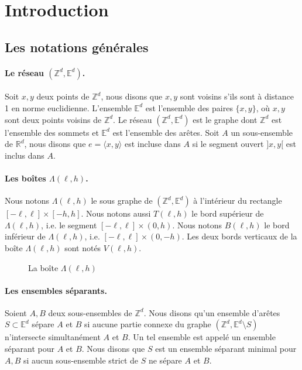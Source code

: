 \documentclass[titlepage,a4paper,12pt]{article}
\newcounter{th}
\begin{document}
\section{Introduction}
\subsection{Les notations générales}
\paragraph{Le réseau $(\mathbb{Z}^d,\mathbb{E}^d)$.} Soit $x,y$ deux points de $\mathbb{Z}^d$, nous disons que $x,y$ sont voisins s'ils sont à distance 1 en norme euclidienne. L'ensemble $\mathbb{E}^d$ est l'ensemble des paires $\{x,y\}$, où $x,y$ sont deux points voisins de $\mathbb{Z}^d$. Le réseau $(\mathbb{Z}^d, \mathbb{E}^d)$ est le graphe dont $\mathbb{Z}^d$ est l'ensemble des sommets et $\mathbb{E}^d$ est l'ensemble des arêtes. Soit $A$ un sous-ensemble de $\mathbb{R}^d$, nous disons que $e = \langle x,y\rangle$ est incluse dans $A$ si le segment ouvert $]x,y[$ est inclus dans $A$.

\paragraph{Les boîtes $\Lambda(\ell,h)$.} Nous notons $\Lambda(\ell,h)$ le sous graphe de $(\mathbb{Z}^d,\mathbb{E}^d)$ à l'inté\-rieur du rectangle $[-\ell,\ell]\times[-h,h]$. Nous notons aussi $T(\ell,h)$ le bord supérieur de $\Lambda(\ell,h)$, i.e. le segment $[-\ell,\ell]\times(0,h)$. Nous notons $B(\ell,h)$ le bord inférieur de $\Lambda(\ell,h)$, i.e. $[-\ell,\ell]\times(0,-h)$. Les deux bords verticaux de la boîte $\Lambda(\ell,h)$ sont notés $V(\ell,h)$.
\begin{figure}[h]
\center
{}
\caption{La boîte $\Lambda(\ell,h)$}
\end{figure}

\paragraph{Les ensembles séparants.} Soient $A,B$ deux sous-ensembles de $\mathbb{Z}^d$. Nous disons qu'un ensemble d'arêtes $S\subset \mathbb{E}^d$ sépare $A$ et $B$ si aucune partie connexe du graphe $(\mathbb{Z}^d,\mathbb{E}^d \setminus S)$ n'intersecte simultanément $A$ et $B$. Un tel ensemble est appelé un ensemble séparant pour $A$ et $B$. Nous disons que $S$ est un ensemble séparant minimal pour $A,B$ si aucun sous-ensemble strict de $S$ ne sépare $A$ et $B$.
\end{document}

